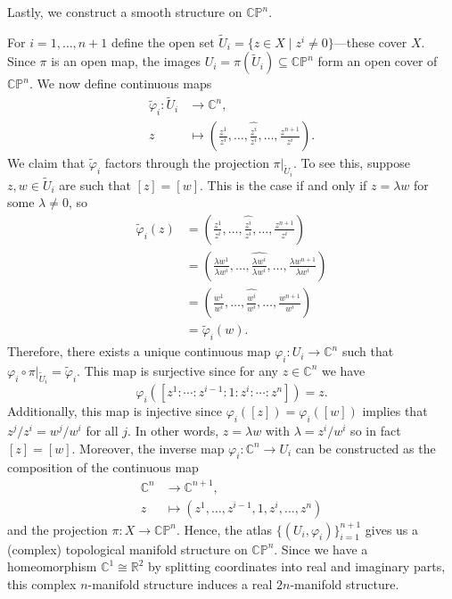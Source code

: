 \documentclass[12pt]{article}
\theoremstyle{definition}
\newcommand{\R}{\mathbb{R}}
\newcommand{\C}{\mathbb{C}}
\renewcommand{\P}{\mathbb{P}}
\renewcommand{\phi}{\varphi}
\newcommand{\<}{\langle}
\renewcommand{\>}{\rangle}
\newcommand{\iso}{\cong}
\newcommand{\seq}{\subseteq}
\renewcommand{\tilde}{\widetilde}
\renewcommand{\hat}{\widehat}
\begin{document}
Lastly, we construct a smooth structure on $\C\P^n$.

For $i = 1, \dots, n+1$ define the open set $\tilde{U}_i = \{z \in X \mid z^i \ne 0\}$---these cover $X$.
Since $\pi$ is an open map, the images $U_i = \pi(\tilde{U}_i) \seq \C\P^n$ form an open cover of $\C\P^n$.
We now define continuous maps
\begin{align*}
    \tilde{\phi}_i : \tilde{U}_i &\longrightarrow \C^n, \\
        z &\longmapsto \textstyle\left(\frac{z^1}{z^i}, \dots, \hat{\frac{z^i}{z^i}}, \dots, \frac{z^{n+1}}{z^i}\right).
\end{align*}
We claim that $\tilde{\phi}_i$ factors through the projection $\pi|_{\tilde{U}_i}$.
To see this, suppose $z, w \in \tilde{U}_i$ are such that $[z] = [w]$.
This is the case if and only if $z = \lambda w$ for some $\lambda \ne 0$, so
\begin{align*}
    \tilde{\phi}_i(z)
        &= \textstyle\left(\frac{z^1}{z^i}, \dots, \hat{\frac{z^i}{z^i}}, \dots, \frac{z^{n+1}}{z^i}\right) \\
        &= \textstyle\left(\frac{\lambda w^1}{\lambda w^i}, \dots, \hat{\frac{\lambda w^i}{\lambda w^i}}, \dots, \frac{\lambda w^{n+1}}{\lambda w^i}\right) \\
        &= \textstyle\left(\frac{w^1}{w^i}, \dots, \hat{\frac{w^i}{w^i}}, \dots, \frac{w^{n+1}}{w^i}\right) \\
        &= \tilde{\phi}_i(w).
\end{align*}
Therefore, there exists a unique continuous map $\phi_i : U_i \to \C^n$ such that $\phi_i \circ \pi|_{\tilde{U}_i} = \tilde{\phi}_i$.
This map is surjective since for any $z \in \C^n$ we have
\[
    \phi_i([z^1 : \cdots : z^{i-1} : 1 : z^i : \cdots : z^n]) = z.
\]
Additionally, this map is injective since $\phi_i([z]) = \phi_i([w])$ implies that $z^j/z^i = w^j/w^i$ for all $j$.
In other words, $z = \lambda w$ with $\lambda = z^i/w^i$ so in fact $[z] = [w]$.
Moreover, the inverse map $\phi_i : \C^n \to U_i$ can be constructed as the composition of the continuous map
\begin{align*}
    \C^n &\longrightarrow \C^{n+1}, \\
    z &\longmapsto (z^1, \dots, z^{i-1}, 1, z^i, \dots, z^n)
\end{align*}
and the projection $\pi : X \to \C\P^n$.
Hence, the atlas $\{(U_i, \phi_i)\}_{i=1}^{n+1}$ gives us a (complex) topological manifold structure on $\C\P^n$.
Since we have a homeomorphism $\C^1 \iso \R^2$ by splitting coordinates into real and imaginary parts, this complex $n$-manifold structure induces a real $2n$-manifold structure.
\end{document}
